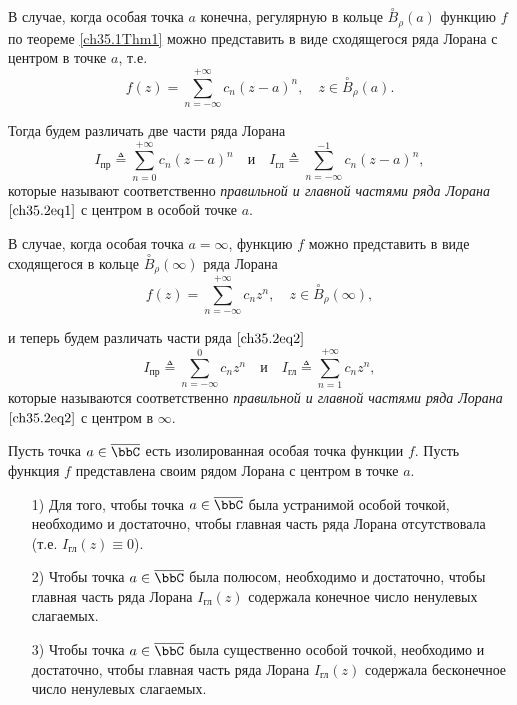 В случае, когда особая точка $a$ конечна, регулярную в кольце $\overset{\circ}{B}_\rho(a)$ функцию $f$ по теореме \ref{ch35.1Thm1} можно представить в виде сходящегося ряда Лорана с центром в точке $a$, т.е.
\begin{equation} \label{ch35.2eq1}
f(z) = \sum_{n = -\infty}^{+\infty} c_n (z - a)^n, \quad z \in \overset{\circ}{B}_\rho(a).
\end{equation}

Тогда будем различать две части ряда Лорана
$$
I_{\text{пр}} \triangleq \sum_{n = 0}^{+\infty} c_n (z - a)^n \quad \text{и} \quad I_{\text{гл}} \triangleq \sum_{n = -\infty}^{-1} c_n (z - a)^n,
$$
которые называют соответственно \textit{правильной и главной частями ряда Лорана} $\eqref{ch35.2eq1}$ с центром в особой точке $a$.

В случае, когда особая точка $a = \infty$, функцию $f$ можно представить в виде сходящегося в кольце $\overset{\circ}{B}_\rho(\infty)$ ряда Лорана
\begin{equation} \label{ch35.2eq2}
f(z) = \sum_{n = -\infty}^{+\infty} c_n z^n, \quad z \in \overset{\circ}{B}_\rho(\infty),
\end{equation}

и теперь будем различать части ряда $\eqref{ch35.2eq2}$
$$
I_{\text{пр}} \triangleq \sum_{n = -\infty}^{0} c_n z^n \quad \text{и} \quad I_{\text{гл}} \triangleq \sum_{n = 1}^{+\infty} c_n z^n,
$$
которые называются соответственно \textit{правильной и главной частями ряда Лорана} $\eqref{ch35.2eq2}$ с центром в $\infty$.

\begin{thm}\label{Ch35.2Thm5}
Пусть точка $a \in \overline{\bbC}$ есть изолированная особая точка функции $f$. Пусть функция $f$  представлена своим рядом Лорана с центром в точке $a$.

\begin{enumerate}
\item[1)] Для того, чтобы точка $a \in \overline{\bbC}$ была устранимой особой точкой, необходимо и достаточно, чтобы главная часть ряда Лорана отсутствовала (т.е. $I_{\text{гл}}(z) \equiv 0$).
\item[2)]	Чтобы точка $a \in \overline{\bbC}$ была полюсом, необходимо и достаточно, чтобы главная часть ряда Лорана $I_{\text{гл}}(z)$ содержала конечное число ненулевых слагаемых.
\item[3)]	Чтобы точка $a \in \overline{\bbC}$ была существенно особой точкой, необходимо и достаточно, чтобы главная часть ряда Лорана $I_{\text{гл}}(z)$ содержала бесконечное число ненулевых слагаемых.
\end{enumerate}

\end{thm}

